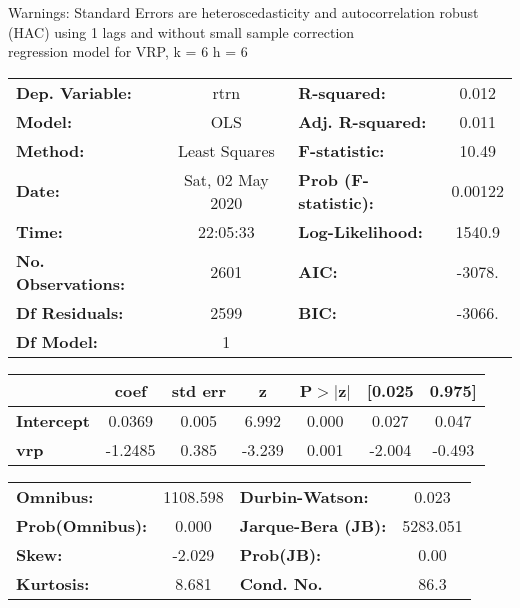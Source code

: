 Warnings: \newline
 [1] Standard Errors are heteroscedasticity and autocorrelation robust (HAC) using 1 lags and without small sample correction\\ 

regression model for VRP, k = 6 h = 6\begin{center}
\begin{tabular}{lclc}
\toprule
\textbf{Dep. Variable:}    &       rtrn       & \textbf{  R-squared:         } &     0.012   \\
\textbf{Model:}            &       OLS        & \textbf{  Adj. R-squared:    } &     0.011   \\
\textbf{Method:}           &  Least Squares   & \textbf{  F-statistic:       } &     10.49   \\
\textbf{Date:}             & Sat, 02 May 2020 & \textbf{  Prob (F-statistic):} &  0.00122    \\
\textbf{Time:}             &     22:05:33     & \textbf{  Log-Likelihood:    } &    1540.9   \\
\textbf{No. Observations:} &        2601      & \textbf{  AIC:               } &    -3078.   \\
\textbf{Df Residuals:}     &        2599      & \textbf{  BIC:               } &    -3066.   \\
\textbf{Df Model:}         &           1      & \textbf{                     } &             \\
\bottomrule
\end{tabular}
\begin{tabular}{lcccccc}
                   & \textbf{coef} & \textbf{std err} & \textbf{z} & \textbf{P$> |$z$|$} & \textbf{[0.025} & \textbf{0.975]}  \\
\midrule
\textbf{Intercept} &       0.0369  &        0.005     &     6.992  &         0.000        &        0.027    &        0.047     \\
\textbf{vrp}       &      -1.2485  &        0.385     &    -3.239  &         0.001        &       -2.004    &       -0.493     \\
\bottomrule
\end{tabular}
\begin{tabular}{lclc}
\textbf{Omnibus:}       & 1108.598 & \textbf{  Durbin-Watson:     } &    0.023  \\
\textbf{Prob(Omnibus):} &   0.000  & \textbf{  Jarque-Bera (JB):  } & 5283.051  \\
\textbf{Skew:}          &  -2.029  & \textbf{  Prob(JB):          } &     0.00  \\
\textbf{Kurtosis:}      &   8.681  & \textbf{  Cond. No.          } &     86.3  \\
\bottomrule
\end{tabular}
\end{center}

